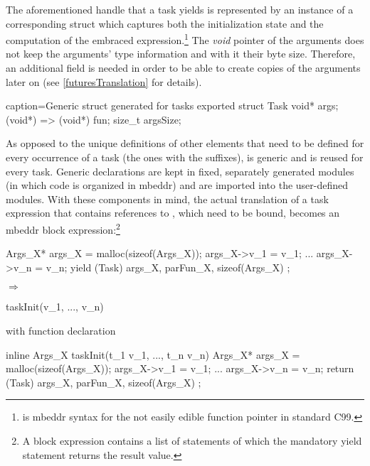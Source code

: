 The aforementioned handle that a task yields is represented by an instance of a corresponding struct which captures both the initialization state and the computation of the embraced expression.\footnote{ is mbeddr syntax for the not easily edible function pointer  in standard C99.} The \textit{void} pointer of the arguments  does not keep the arguments' type information and with it their byte size. Therefore, an additional field  is needed in order to be able to create copies of the arguments later on (see \ref{futuresTranslation} for details).
\begin{ccode}{caption=Generic struct generated for tasks}
exported struct Task {
  void* args;
  (void*) => (void*) fun;
  size_t argsSize;
}
\end{ccode}

As opposed to the unique definitions of other elements that need to be defined for every occurrence of a task (the ones with the  suffixes),  is generic and is reused for every task. Generic declarations are kept in fixed, separately generated modules (in which code is organized in mbeddr) and are imported into the user-defined modules.
With these components in mind, the actual translation of a task expression  that contains references  to , which need to be bound, becomes an mbeddr block expression:\footnote{A block expression contains a list of statements of which the mandatory yield statement returns the result value.}

\begin{minipage}{1\textwidth}
\begin{center}
\begin{minipage}{0.35\textwidth}
\begin{ccode}{}
{
  Args_X* args_X = 
    malloc(sizeof(Args_X));
  args_X->v_1 = v_1;
  ...
  args_X->v_n = v_n;
  yield (Task){ args_X, parFun_X, 
                sizeof(Args_X) };
}
\end{ccode}
\end{minipage}
\begin{minipage}{0.1\textwidth}
\quad$\Longrightarrow$\qquad
\end{minipage}
\begin{minipage}{0.5\textwidth}
\begin{ccode}{}
taskInit(v_1, ..., v_n)
\end{ccode}
with function declaration
\begin{ccode}{}
inline Args_X taskInit(t_1 v_1, ..., t_n v_n) {
  Args_X* args_X = malloc(sizeof(Args_X));
  args_X->v_1 = v_1;
  ...
  args_X->v_n = v_n;
  return (Task){ args_X, parFun_X, 
                 sizeof(Args_X) };
}
\end{ccode}
\end{minipage}
\end{center}
\label{lst:taskReduction}
\end{minipage}
\vspace*{4mm}

